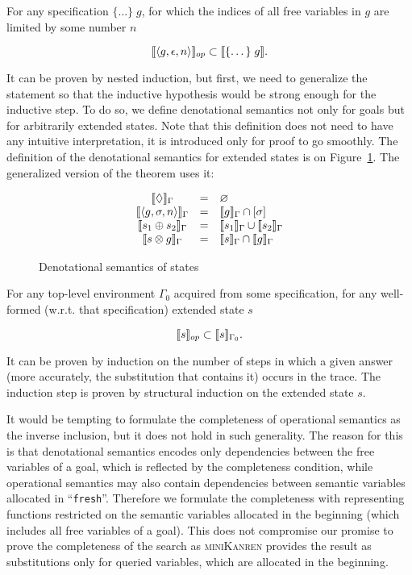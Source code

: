 \begin{theorem}
For any specification $\{\dots\}\; g$, for which the indices of all free variables in $g$ are limited by some number $n$

\[
\llbracket{\left<{g, \epsilon, n}\right>}\rrbracket_{op} \subset \llbracket{\{\dots\}\; g}\rrbracket.
\]
\end{theorem}

It can be proven by nested induction, but first, we need to generalize the statement so that the inductive hypothesis would be strong enough for the inductive step.
To do so, we define denotational semantics not only for goals but for arbitrarily extended states. Note that this definition does not need to have any intuitive
interpretation, it is introduced only for proof to go smoothly. The definition of the denotational semantics for extended states is on Figure~\ref{denotational_semantics_of_states}.
The generalized version of the theorem uses it:

\begin{figure}[t]
  \[
  \begin{array}{ccl}
    \llbracket{\Diamond}\rrbracket_\Gamma&=&\varnothing\\
    \llbracket{\left<{g, \sigma, n}\right>}\rrbracket_\Gamma&=&\llbracket{g}\rrbracket_\Gamma\cap[\sigma]\\
    \llbracket{s_1 \oplus s_2}\rrbracket_\Gamma&=&\llbracket{s_1}\rrbracket_\Gamma\cup\llbracket{s_2}\rrbracket_\Gamma\\
    \llbracket{s \otimes g}\rrbracket_\Gamma&=&\llbracket{s}\rrbracket_\Gamma\cap\llbracket{g}\rrbracket_\Gamma\\
  \end{array}
  \]
  \caption{Denotational semantics of states}
  \label{denotational_semantics_of_states}
\end{figure}

\begin{lemma}
For any top-level environment $\Gamma_0$ acquired from some specification, for any well-formed (w.r.t. that specification) extended state $s$

\[
\llbracket{s}\rrbracket_{op} \subset \llbracket{s}\rrbracket_{\Gamma_0}.
\]
\end{lemma}

It can be proven by induction on the number of steps in which a given answer (more accurately, the substitution that contains it) occurs in the trace.
The induction step is proven by structural induction on the extended state $s$.

It would be tempting to formulate the completeness of operational semantics as the inverse inclusion, but it does not hold in such generality. The reason for
this is that denotational semantics encodes only dependencies between the free variables of a goal, which is reflected by the completeness condition, while
operational semantics may also contain dependencies between semantic variables allocated in ``\lstinline|fresh|''. Therefore we formulate the completeness
with representing functions restricted on the semantic variables allocated in the beginning (which includes all free variables of a goal). This does not
compromise our promise to prove the completeness of the search as \textsc{miniKanren} provides the result as substitutions only for queried variables,
which are allocated in the beginning.

